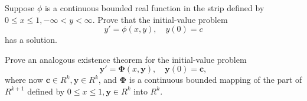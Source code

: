   \begin{exercise}[Rudin 7.25]
    Suppose $\phi$ is a continuous bounded real function in the strip defined by $0 \le x \le 1, -\infty < y < \infty$. Prove that the initial-value problem
    \begin{equation}
      y' = \phi(x, y), \quad y(0) = c
    \end{equation}
    has a solution.
  \end{exercise}
  \begin{solution}

  \end{solution}

  \begin{exercise}[Rudin 7.26]
    Prove an analogous existence theorem for the initial-value problem
    \begin{equation}
      \mathbf{y}' = \mathbf{\Phi}(x, \mathbf{y}), \quad \mathbf{y}(0) = \mathbf{c},
    \end{equation}
    where now $\mathbf{c} \in R^k, \mathbf{y} \in R^k$, and $\mathbf{\Phi}$ is a continuous bounded mapping of the part of $R^{k+1}$ defined by $0 \le x \le 1, \mathbf{y} \in R^k$ into $R^k$.
  \end{exercise}
  \begin{solution}

  \end{solution}

